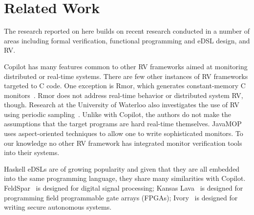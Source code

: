 \section{Related Work}\label{sec:related}
The research reported on here builds on recent  research conducted in a number
of areas including formal verification, functional programming and
eDSL design, and RV.  

Copilot has many features common to other RV frameworks aimed at
 monitoring distributed or real-time systems.  
There are few other instances of RV frameworks targeted to C code.  One exception is {\sc
  Rmor}, which generates constant-memory C monitors~\cite{havelundc}.  {\sc
  Rmor} does not address real-time behavior or distributed system RV,
though.   Research at the University of Waterloo also investigates the use of
 RV using  periodic sampling~\cite{sampling}.  Unlike with Copilot, the authors
do not make the assumptions that the target programs are hard real-time
themselves.  JavaMOP~\cite{javamop}  uses aspect-oriented techniques
to allow one to write sophisticated monitors. To our knowledge no
other RV framework has integrated monitor verification tools into
their systems. 

Haskell eDSLs are of growing popularity and given that they are all
embedded into the same programming language, they share many
similarities with Copilot. FeldSpar~\cite{feldspar} is designed for digital signal
processing;  Kansas Lava~\cite{Gill:14:DSLs} is designed for
programming  field programmable gate arrays (FPGAs);
Ivory~\cite{pike-plpv14} is designed for writing secure autonomous
systems.   

